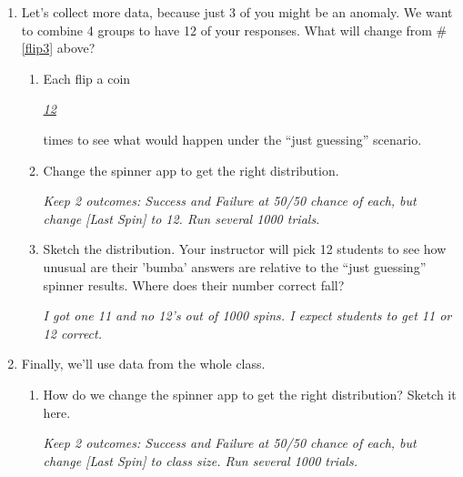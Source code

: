 \begin{enumerate}
  \item Let's collect more data, because just 3 of you might be an
    anomaly.  We want to combine 4 groups to have 12 of your
    responses. What will change from \# \ref{flip3} above? \\
    \begin{enumerate}
    \item Each flip a coin \underline{\hspace{.5in}} 
\begin{key}
   {\it \underline{12}}
\end{key}
        times to see
      what would happen under the ``just guessing'' scenario. 
    \item Change the spinner app to get the right  distribution.
\begin{students}
  \vspace{2cm}
\end{students}    
\begin{key}
   {\it Keep 2 outcomes: Success and Failure at 50/50 chance of each,
     but change [Last Spin] to 12. Run several 1000 trials. }
\end{key}
   

\item Sketch the distribution. Your instructor will pick 12 students
  to see how unusual are their 'bumba' answers are relative to the
  ``just guessing'' spinner results. Where does their number
  correct fall?
\begin{students}
  \vspace{3cm}
\end{students}    
\begin{key}
   {\it I got one 11 and no 12's out of 1000 spins. I expect students
     to get 11 or 12 correct.}
\end{key}
    \end{enumerate}


\item Finally, we'll use data from the whole class. 
    \begin{enumerate}
    \item How do we change the spinner app to get the right
      distribution?  Sketch it here.
\begin{students}
  \vspace{4cm}
\end{students}    
\begin{key}
   {\it Keep 2 outcomes: Success and Failure at 50/50 chance of each,
     but change [Last Spin] to class size. Run several 1000 trials. }
\end{key}


\end{enumerate}
\end{enumerate}
